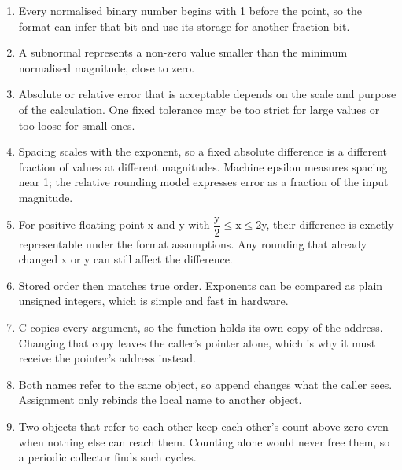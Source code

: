 \documentclass[11pt]{article}
\begin{document}
\begin{keepsection}
\begin{enumerate}
\item Every normalised binary number begins with 1 before the point, so the format can infer that bit and use its storage for another fraction bit.
\item A subnormal represents a non-zero value smaller than the minimum normalised magnitude, close to zero.
\item Absolute or relative error that is acceptable depends on the scale and purpose of the calculation. One fixed tolerance may be too strict for large values or too loose for small ones.
\item Spacing scales with the exponent, so a fixed absolute difference is a different fraction of values at different magnitudes. Machine epsilon measures spacing near 1; the relative rounding model expresses error as a fraction of the input magnitude.
\item For positive floating-point x and y with {\small\ensuremath{\dfrac{\mathrm{y}}{2}}}\ensuremath{\leq}x\ensuremath{\leq}2y, their difference is exactly representable under the format assumptions. Any rounding that already changed x or y can still affect the difference.
\item Stored order then matches true order. Exponents can be compared as plain unsigned integers, which is simple and fast in hardware.
\item C copies every argument, so the function holds its own copy of the address. Changing that copy leaves the caller’s pointer alone, which is why it must receive the pointer’s address instead.
\item Both names refer to the same object, so append changes what the caller sees. Assignment only rebinds the local name to another object.
\item Two objects that refer to each other keep each other’s count above zero even when nothing else can reach them. Counting alone would never free them, so a periodic collector finds such cycles.
\end{enumerate}

\end{keepsection}
\end{document}
